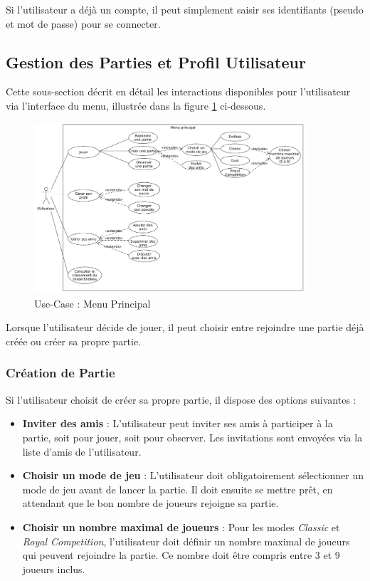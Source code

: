 \documentclass{report}
\begin{document}
\noindent Si l'utilisateur a déjà un compte, il peut simplement saisir ses identifiants (pseudo et mot de passe) pour se connecter.



\subsection{Gestion des Parties et Profil Utilisateur}

\noindent Cette sous-section décrit en détail les interactions disponibles pour l'utilisateur via l'interface du menu, illustrée dans la figure \ref{fig:use_case_menu} ci-dessous. 

\vspace{-1em}

\begin{figure}[H]
    \centering
     \includegraphics[width=0.9\textwidth, keepaspectratio]{src/user_req/menu.png}
    \caption{Use-Case : Menu Principal}
    \label{fig:use_case_menu}
\end{figure}

\noindent Lorsque l'utilisateur décide de jouer, il peut choisir entre rejoindre une partie déjà créée ou créer sa propre partie.

\subsubsection{Création de Partie}

\noindent Si l'utilisateur choisit de créer sa propre partie, il dispose des options suivantes :
\begin{itemize}
    \item \textbf{Inviter des amis} : L'utilisateur peut inviter ses amis à participer à la partie, soit pour jouer, soit pour observer. Les invitations sont envoyées via la liste d'amis de l'utilisateur.
    \item \textbf{Choisir un mode de jeu} : L'utilisateur doit obligatoirement sélectionner un mode de jeu avant de lancer la partie. Il doit ensuite se mettre prêt, en attendant que le bon nombre de joueurs rejoigne sa partie.
    \item \textbf{Choisir un nombre maximal de joueurs} : Pour les modes \emph{Classic} et \emph{Royal Competition}, l'utilisateur doit définir un nombre maximal de joueurs qui peuvent rejoindre la partie. Ce nombre doit être compris entre 3 et 9 joueurs inclus.
\end{itemize}
\end{document}
